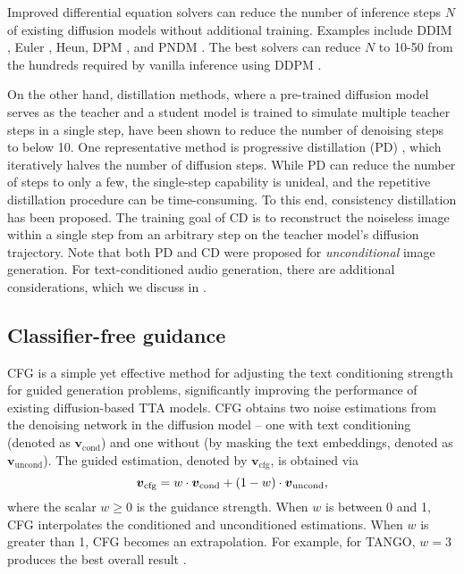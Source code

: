 \documentclass{article}
\newcommand{\sv}{\boldsymbol{v}}
\newcommand{\svcfg}{\sv_{\textrm{cfg}}}
\newcommand{\svcond}{\sv_{\textrm{cond}}}
\newcommand{\svuncond}{\sv_{\textrm{uncond}}}
\begin{document}
Improved differential equation solvers can reduce the number of inference steps $N$ of existing diffusion models without additional training. Examples include DDIM \cite{ddim}, Euler \cite{euler}, Heun, DPM \cite{dpm, dpm++}, and PNDM \cite{pndm}. The best solvers can reduce $N$ to 10-50 from the hundreds required by vanilla inference using DDPM \cite{ddpm}.

On the other hand, distillation methods, where a pre-trained diffusion model serves as the teacher and a student model is trained to simulate multiple teacher steps in a single step, have been shown to reduce the number of denoising steps to below 10. One representative method is progressive distillation (PD) \cite{pd}, which iteratively halves the number of diffusion steps. While PD can reduce the number of steps to only a few, the single-step capability is unideal, and the repetitive distillation procedure can be time-consuming. To this end, consistency distillation \cite{cm} has been proposed. The training goal of CD is to reconstruct the noiseless image within a single step from an arbitrary step on the teacher model's diffusion trajectory. Note that both PD and CD were proposed for \textit{unconditional} image generation. For text-conditioned audio generation, there are additional considerations, which we discuss in .


\subsection{Classifier-free guidance}

CFG \cite{cfg} is a simple yet effective method for adjusting the text conditioning strength for guided generation problems, significantly improving the performance of existing diffusion-based TTA models. CFG obtains two noise estimations from the denoising network in the diffusion model -- one with text conditioning (denoted as $\svcond$) and one without (by masking the text embeddings, denoted as $\svuncond$). The guided estimation, denoted by $\svcfg$, is obtained via
\vspace{-.4mm}
\begin{equation} \label{eq:cfg}
    \svcfg = w \cdot \svcond + (1 - w) \cdot \svuncond,
    \vspace{-.4mm}
\end{equation}
where the scalar $w \geq 0$ is the guidance strength. When $w$ is between 0 and 1, CFG interpolates the conditioned and unconditioned estimations. When $w$ is greater than 1, CFG becomes an extrapolation. For example, for TANGO, $w = 3$ produces the best overall result \cite{tango}.
\end{document}
